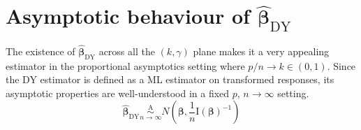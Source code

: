\documentclass{article}
\begin{document}
\section{Asymptotic behaviour of $\hat{\boldsymbol{\beta}}_{\text{DY}}$}
The existence of  $\hat{\boldsymbol{\beta}}_{\text{DY}}$ across all the $(k,\gamma)$ plane makes it a very appealing estimator in the proportional asymptotics setting where $p/n\rightarrow k\in(0,1)$. Since the DY estimator is defined as a ML estimator on transformed responses, its asymptotic properties are well-understood in a fixed $p$, $n\rightarrow\infty$ setting.
\begin{equation*}
\hat{\boldsymbol{\beta}}_{\text{DY}}\underset{n\rightarrow \infty}{\overset{\text{A}}\sim}N \left(\boldsymbol{\beta},\frac{1}{n}\text{I}(\boldsymbol{\beta})^{-1} \right)
\end{equation*}
\end{document}
